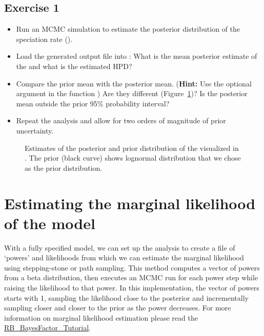 \subsection{Exercise 1}

\begin{itemize}
\item Run an MCMC simulation to estimate the posterior distribution of the speciation rate ().
\item Load the generated output file into \Tracer: What is the mean posterior estimate of the  and what is the estimated HPD?
\item Compare the prior mean with the posterior mean. (\textbf{Hint:} Use the optional argument  in the function ) Are they different (\EG Figure~\ref{fig:prior_posterior})? Is the posterior mean outside the prior 95\% probability interval?
\item Repeat the analysis and allow for two orders of magnitude of prior uncertainty.
\end{itemize}
\begin{figure}[h!]
\centering
{}
\caption{\small Estimates of the posterior and prior distribution of the  visualized in \Tracer. The prior (black curve) shows lognormal distribution that we chose as the prior distribution.}
\label{fig:prior_posterior}
\end{figure}


\section{Estimating the marginal likelihood of the model}

With a fully specified model, we can set up the  analysis to create a file of `powers' and likelihoods from which we can estimate the marginal likelihood using stepping-stone or path sampling. 
This method computes a vector of powers from a beta distribution, then executes an MCMC run for each power step while raising the likelihood to that power. In this implementation, the vector of powers starts with 1, sampling the likelihood close to the posterior and incrementally sampling closer and closer to the prior as the power decreases. 
For more information on marginal likelihood estimation please read the \href{https://github.com/revbayes/revbayes_tutorial/raw/master/tutorial_TeX/RB_BayesFactor_Tutorial/RB_BayesFactor_Tutorial.pdf}{RB\_BayesFactor\_Tutorial}.

